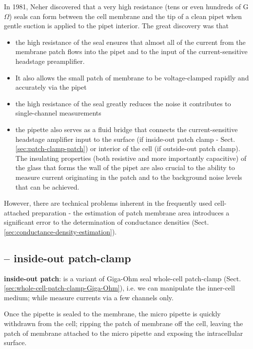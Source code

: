 In 1981, Neher discovered that a very high resistance (tens or even hundreds of
G$\Omega$) seals can form between the cell membrane and the tip of a clean pipet
when gentle suction is applied to the pipet interior. The great discovery was
that
\begin{itemize}

  \item the high resistance of the seal ensures that almost all of the current
  from the membrane patch flows into the pipet and to the input of the
current-sensitive headstage preamplifier.

  \item It also allows the small patch of membrane to be voltage-clamped rapidly
  and accurately via the pipet

  \item the high resistance of the seal greatly reduces the noise it contributes
  to single-channel measurements

  \item the pipette also serves as a fluid bridge that connects
the current-sensitive headstage amplifier input to the surface (if inside-out
patch clamp - Sect.\ref{sec:patch-clamp-patch}) or interior of the cell (if outside-out
patch clamp).
The insulating properties (both resistive and more importantly capacitive) of the
glass that forms the wall of the pipet are also crucial to the ability to
measure current originating in the patch and to the background noise levels that
can be achieved.
\end{itemize}



However, there are technical problems inherent in the frequently used
cell-attached preparation - the estimation of patch membrane area introduces a
significant error to the determination of conductance densities
(Sect.\ref{sec:conductance-density-estimation}).



\subsection{-- inside-out patch-clamp}
\label{sec:patch_clamp-inside-out}

{\bf inside-out patch}: is a variant of Giga-Ohm seal whole-cell patch-clamp
(Sect.\ref{sec:whole-cell-patch-clamp-Giga-Ohm}), i.e. we can manipulate the
inner-cell medium; while measure currents via a few channels only. 

Once the pipette is sealed to the membrane, the
micro pipette is quickly withdrawn from the cell; ripping the patch of
membrane off the cell, leaving the patch of membrane attached to the micro
pipette and exposing the intracellular surface.

